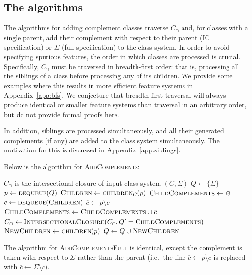 \documentclass[12pt, oneside]{article}   	%
\begin{document}
\subsection{The algorithms}

The algorithms for adding complement classes traverse $C_\cap$ and, for classes with a single parent, add their complement with respect to their parent (IC specification) or $\Sigma$ (full specification) to the class system. In order to avoid specifying spurious features, the order in which classes are processed is crucial. Specifically, $C_\cap$ must be traversed in breadth-first order: that is, processing all the siblings of a class before processing any of its children. We provide some examples where this results in more efficient feature systems in Appendix~\ref{app:bfs}. We conjecture that breadth-first traversal will always produce identical or smaller feature systems than traversal in an arbitrary order, but do not provide formal proofs here. 

In addition, siblings are processed simultaneously, and all their generated complements (if any) are added to the class system simultaneously. The motivation for this is discussed in Appendix~\ref{app:siblings}.

Below is the algorithm for \textsc{AddComplements}:

\noindent \begin{algorithmic}
	\singlespacing
	\REQUIRE $C_\cap$ is the intersectional closure of input class system $(C, \Sigma)$
	\STATE
	\STATE $Q \leftarrow \{\Sigma\}$
	\STATE
	\STATE $p \leftarrow \textsc{dequeue}(Q)$
	\STATE $\textsc{Children} \leftarrow \textsc{children}_C(p)$
	\STATE $\textsc{ChildComplements} \leftarrow \varnothing$
	\STATE $c \leftarrow \textsc{dequeue}(\textsc{Children})$
	\STATE $\overline{c} \leftarrow p \setminus c$
	\STATE $\textsc{ChildComplements} \leftarrow \textsc{ChildComplements} \cup \overline{c}$
	\ENDIF
	\ENDWHILE
	\STATE $C_\cap \leftarrow \textsc{IntersectionalClosure}(C_\cap, Q' = \textsc{ChildComplements})$
	\STATE $\textsc{NewChildren} \leftarrow \textsc{children}(p)$
	\STATE $Q \leftarrow Q \cup \textsc{NewChildren}$
	\ENDWHILE
\end{algorithmic}
\doublespacing

\vspace{\baselineskip} \noindent The algorithm for \textsc{AddComplementsFull} is identical, except the complement is taken with respect to $\Sigma$ rather than the parent (i.e., the line $\overline{c} \leftarrow p \setminus c$ is replaced with $\overline{c} \leftarrow \Sigma \setminus c$).
\end{document}
